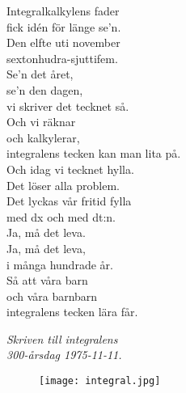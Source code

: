 \documentclass[a6paper,10pt]{article}
\begin{document}
\noindent
Integralkalkylens fader \\
fick idén för länge se'n. \\
Den elfte uti november \\
sextonhudra-sjuttifem. \\
Se'n det året, \\
se'n den dagen, \\
vi skriver det tecknet så. \\
Och vi räknar \\
och kalkylerar, \\
integralens tecken kan man lita på. 
\vspace{5pt} \\
Och idag vi tecknet hylla. \\
Det löser alla problem. \\
Det lyckas vår fritid fylla \\
med dx och med dt:n. \\
Ja, må det leva. \\
Ja, må det leva, \\
i många hundrade år. \\
Så att våra barn \\
och våra barnbarn \\
integralens tecken lära får. 
\begin{flushright}
\textit{Skriven till integralens\\ 300-årsdag 1975-11-11.}
\end{flushright}
\vspace{-10pt}
\begin{figure}[!h]
\hspace{30pt}\texttt{[image: integral.jpg]}
\end{figure}
\end{document}
